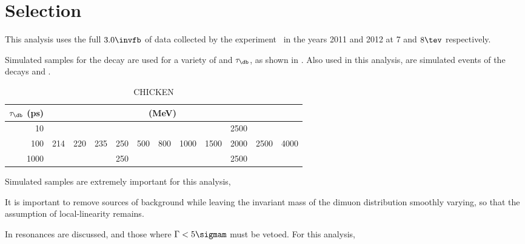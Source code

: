 \section{Selection}

This analysis uses the full $3.0\invfb$ of data collected by the \lhcb
experiment~ in the years 2011 and 2012 at 7 and $8\tev$ respectively.

Simulated samples for the decay \btokstrdb are used for a variety of \mass{\db} and $\tau_\db$, as
shown in .
Also used in this analysis, are simulated events of the decays \btokstrmumu and \btojpsikstr.




\begin{table}
  \caption{
    CHICKEN
  }
  \label{tab:db:samples}
  \begin{center}
    \begin{tabular}{rccccccccccc}\toprule
      $\tau_\db$ (ps) & \multicolumn{10}{c}{\mass{\db} (MeV)} \\\midrule
      10 &&&&&&&&&2500 \\
      100 &214&220&235&250&500&800&1000&1500&2000&2500&4000 \\
      1000 &&&&250&&&&&2500 \\
      \bottomrule
    \end{tabular}
  \end{center}
\end{table}



Simulated samples are extremely important for this analysis,




It is important to remove sources of background while leaving the invariant mass of the dimuon
distribution smoothly varying, so that the assumption of local-linearity remains.

In  resonances are discussed, and those where $\Gamma<5\sigmam$ must be vetoed.
For this analysis,





